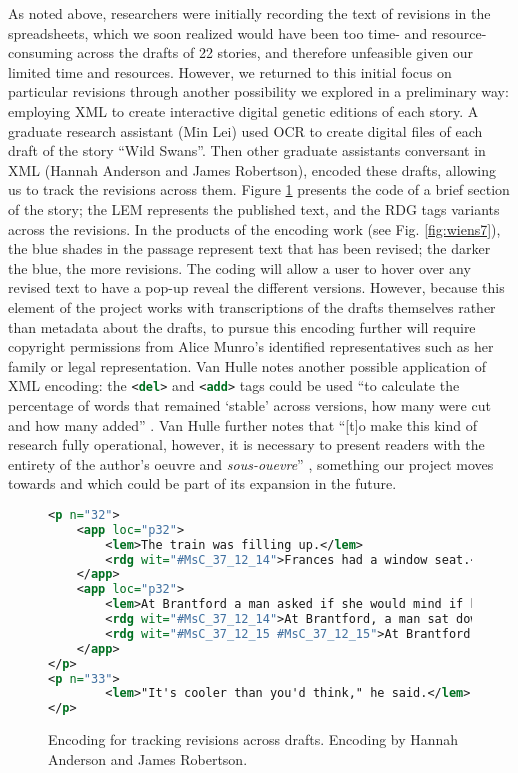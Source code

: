 \begin{paper}
As noted above, researchers were initially recording the text of
revisions in the spreadsheets, which we soon realized would have been
too time- and resource-consuming across the drafts of 22 stories, and
therefore unfeasible given our limited time and resources. However, we
returned to this initial focus on particular revisions through another
possibility we explored in a preliminary way: employing XML to create
interactive digital genetic editions of each story. A graduate research
assistant (Min Lei) used OCR to create digital files of each draft of
the story ``Wild Swans''. Then other graduate assistants conversant in
XML (Hannah Anderson and James Robertson), encoded these drafts,
allowing us to track the revisions across them. Figure \ref{fig:wiens6} presents the
code of a brief section of the story; the LEM represents the published
text, and the RDG tags variants across the revisions. In the products of
the encoding work (see Fig. \ref{fig:wiens7}), the blue shades in the passage represent
text that has been revised; the darker the blue, the more revisions. The
coding will allow a user to hover over any revised text to have a pop-up
reveal the different versions. However, because this element of the
project works with transcriptions of the drafts themselves rather than
metadata about the drafts, to pursue this encoding further will require
copyright permissions from Alice Munro’s identified representatives
such as her family or legal representation. Van Hulle notes another
possible application of XML encoding: the \lstinline[language=XML]!<del>!
and \lstinline[language=XML]!<add>! tags could be used ``to calculate the
percentage of words that remained `stable' across versions, how many
were cut and how many added'' \citep[174]{van_hulle_genetic_2022}. Van Hulle further notes
that ``{[}t{]}o make this kind of research fully operational, however,
it is necessary to present readers with the entirety of the author's
oeuvre and \emph{sous-ouevre}'' \citep[174]{van_hulle_genetic_2022}, something our project moves
towards and which could be part of its expansion in the future.


\begin{figure}[t]
    \tiny
    \begin{lstlisting}[language=xml]    
<p n="32">
    <app loc="p32">
        <lem>The train was filling up.</lem>
        <rdg wit="#MsC_37_12_14">Frances had a window seat.</rdg>
    </app>
    <app loc="p32">
        <lem>At Brantford a man asked if she would mind if he sat down beside her.</lem>
        <rdg wit="#MsC_37_12_14">At Brantford, a man sat down beside her.</rdg>
        <rdg wit="#MsC_37_12_15 #MsC_37_12_15">At Brantford, a man sat down beside me.</rdg>
    </app>
</p>
<p n="33">
        <lem>"It's cooler than you'd think," he said.</lem>
</p>
    \end{lstlisting}
    \caption{Encoding for tracking revisions across drafts. Encoding by Hannah Anderson and James Robertson.}
    \label{fig:wiens6}


\end{figure}
\end{paper}
